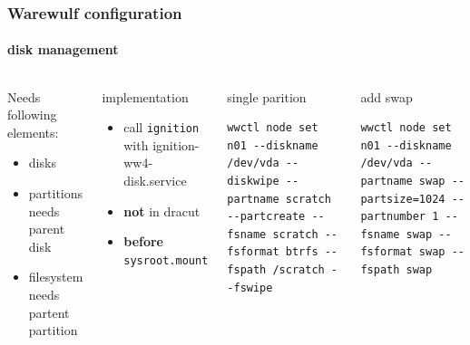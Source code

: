 \documentclass[aspectratio=169]{beamer}
\begin{document}
\begin{frame}[fragile]
\frametitle{Warewulf configuration}
\framesubtitle{disk management}
\begin{columns}
\begin{block}{Needs following elements:}
\begin{itemize}
  \item disks
  \item partitions needs parent disk
  \item filesystem needs partent partition
\end{itemize}
\end{block}
\begin{block}{implementation}
  \begin{itemize}
    \item call \texttt{ignition} with {ignition-ww4-disk.service} \\
    \item \textbf{not} in dracut 
    \item \textbf{before} \texttt{sysroot.mount}
  \end{itemize}
\end{block}
\begin{block}{single parition}
\begin{lstlisting}[style=wwctl]
wwctl node set n01 --diskname /dev/vda --diskwipe --partname scratch --partcreate --fsname scratch --fsformat btrfs --fspath /scratch --fswipe
\end{lstlisting}
\end{block}
\begin{block}{add swap}
\begin{lstlisting}[style=wwctl]
wwctl node set n01 --diskname /dev/vda --partname swap --partsize=1024 --partnumber 1 --fsname swap --fsformat swap --fspath swap
\end{lstlisting}
\end{block}
\end{columns}
\end{frame}
\end{document}
